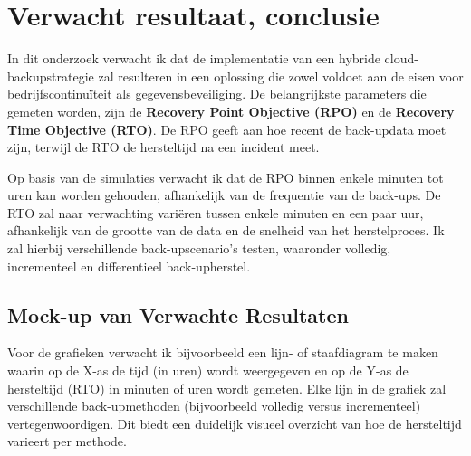 \section{Verwacht resultaat, conclusie}%
\label{sec:verwachte_resultaten}




In dit onderzoek verwacht ik dat de implementatie van een hybride cloud-backupstrategie zal resulteren in een oplossing die zowel voldoet aan de eisen voor bedrijfscontinuïteit als gegevensbeveiliging. De belangrijkste parameters die gemeten worden, zijn de \textbf{Recovery Point Objective (RPO)} en de \textbf{Recovery Time Objective (RTO)}. De RPO geeft aan hoe recent de back-updata moet zijn, terwijl de RTO de hersteltijd na een incident meet.

Op basis van de simulaties verwacht ik dat de RPO binnen enkele minuten tot uren kan worden gehouden, afhankelijk van de frequentie van de back-ups. De RTO zal naar verwachting variëren tussen enkele minuten en een paar uur, afhankelijk van de grootte van de data en de snelheid van het herstelproces. Ik zal hierbij verschillende back-upscenario's testen, waaronder volledig, incrementeel en differentieel back-upherstel.

\subsection{Mock-up van Verwachte Resultaten}
Voor de grafieken verwacht ik bijvoorbeeld een lijn- of staafdiagram te maken waarin op de X-as de tijd (in uren) wordt weergegeven en op de Y-as de hersteltijd (RTO) in minuten of uren wordt gemeten. Elke lijn in de grafiek zal verschillende back-upmethoden (bijvoorbeeld volledig versus incrementeel) vertegenwoordigen. Dit biedt een duidelijk visueel overzicht van hoe de hersteltijd varieert per methode.

